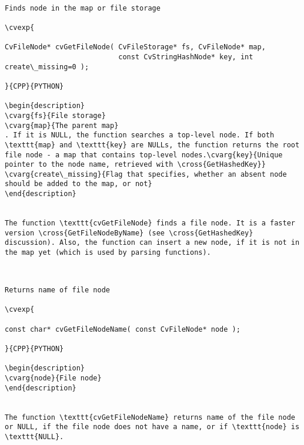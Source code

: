 \begin{verbatim}

Finds node in the map or file storage

\cvexp{

CvFileNode* cvGetFileNode( CvFileStorage* fs, CvFileNode* map,
                           const CvStringHashNode* key, int create\_missing=0 );

}{CPP}{PYTHON}

\begin{description}
\cvarg{fs}{File storage}
\cvarg{map}{The parent map}
. If it is NULL, the function searches a top-level node. If both \texttt{map} and \texttt{key} are NULLs, the function returns the root file node - a map that contains top-level nodes.\cvarg{key}{Unique pointer to the node name, retrieved with \cross{GetHashedKey}}
\cvarg{create\_missing}{Flag that specifies, whether an absent node should be added to the map, or not}
\end{description}


The function \texttt{cvGetFileNode} finds a file node. It is a faster version \cross{GetFileNodeByName} (see \cross{GetHashedKey} discussion). Also, the function can insert a new node, if it is not in the map yet (which is used by parsing functions).


\end{verbatim}
\begin{verbatim}

Returns name of file node

\cvexp{

const char* cvGetFileNodeName( const CvFileNode* node );

}{CPP}{PYTHON}

\begin{description}
\cvarg{node}{File node}
\end{description}


The function \texttt{cvGetFileNodeName} returns name of the file node or NULL, if the file node does not have a name, or if \texttt{node} is \texttt{NULL}.


\end{verbatim}
